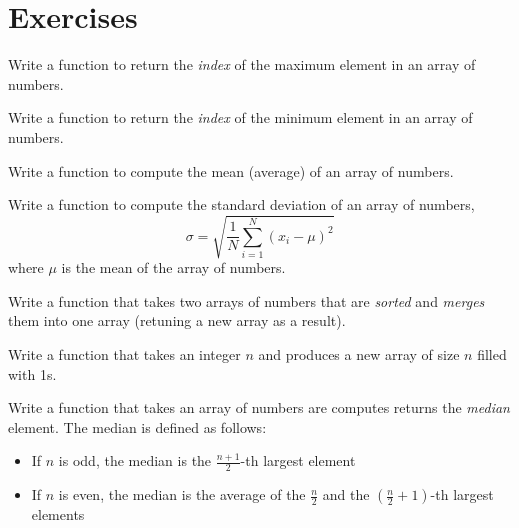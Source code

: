 

\section{Exercises}

\begin{exer}
Write a function to return the \emph{index} of the maximum 
element in an array of numbers.
\end{exer}

\begin{exer}
Write a function to return the \emph{index} of the minimum 
element in an array of numbers.
\end{exer}

\begin{exer}
Write a function to compute the mean (average) of an array of numbers.
\end{exer}

\begin{exer}
Write a function to compute the standard deviation of an array of numbers, 
  $$\sigma = \sqrt{\frac{1}{N} \sum_{i=1}^N (x_i - \mu)^2}$$
where $\mu$ is the mean of the array of numbers.
\end{exer}

\begin{exer}
Write a function that takes two arrays of numbers that are \emph{sorted}
and \emph{merges} them into one array (retuning a new array as a 
result).  
\end{exer}

\begin{exer}
Write a function that takes an integer $n$ and produces a new
array of size $n$ filled with 1s.
\end{exer}

\begin{exer}
Write a function that takes an array of numbers are computes 
returns the \emph{median} element.  The median is defined as 
follows:
 \begin{itemize}
   \item If $n$ is odd, the median is the $\frac{n+1}{2}$-th
       largest element
   \item If $n$ is even, the median is the average of the
       $\frac{n}{2}$ and the $(\frac{n}{2} + 1)$-th largest
       elements
 \end{itemize}
\end{exer}

